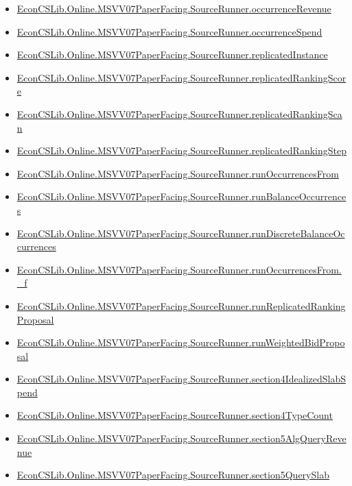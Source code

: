 \documentclass[10pt]{article}
\begin{document}
\begin{itemize}[leftmargin=1.2em]
\begin{itemize}[leftmargin=1.2em]
\item \hyperlink{library-prerequisite-dfbe97ffab7ca7cd}{EconCSLib.Online.MSVV07PaperFacing.SourceRunner.occurrenceRevenue}
\item \hyperlink{library-prerequisite-26a3237cdadc754d}{EconCSLib.Online.MSVV07PaperFacing.SourceRunner.occurrenceSpend}
\item \hyperlink{library-prerequisite-cbbc165407ac6974}{EconCSLib.Online.MSVV07PaperFacing.SourceRunner.replicatedInstance}
\item \hyperlink{library-prerequisite-577eed25c6e44295}{EconCSLib.Online.MSVV07PaperFacing.SourceRunner.replicatedRankingScore}
\item \hyperlink{library-prerequisite-f9094881bfd17c7a}{EconCSLib.Online.MSVV07PaperFacing.SourceRunner.replicatedRankingScan}
\item \hyperlink{library-prerequisite-40e3e9f98c944c47}{EconCSLib.Online.MSVV07PaperFacing.SourceRunner.replicatedRankingStep}
\item \hyperlink{library-prerequisite-f31e5e64ef16e2cc}{EconCSLib.Online.MSVV07PaperFacing.SourceRunner.runOccurrencesFrom}
\item \hyperlink{library-prerequisite-d9300ea6e5b2566f}{EconCSLib.Online.MSVV07PaperFacing.SourceRunner.runBalanceOccurrences}
\item \hyperlink{library-prerequisite-645b23936fd09d4e}{EconCSLib.Online.MSVV07PaperFacing.SourceRunner.runDiscreteBalanceOccurrences}
\item \hyperlink{library-prerequisite-aaf9e733c1bd3341}{EconCSLib.Online.MSVV07PaperFacing.SourceRunner.runOccurrencesFrom.\_f}
\item \hyperlink{library-prerequisite-fd9bc9c4e98ce244}{EconCSLib.Online.MSVV07PaperFacing.SourceRunner.runReplicatedRankingProposal}
\item \hyperlink{library-prerequisite-51c8e4988d8824f9}{EconCSLib.Online.MSVV07PaperFacing.SourceRunner.runWeightedBidProposal}
\item \hyperlink{library-prerequisite-502c8117c74865dd}{EconCSLib.Online.MSVV07PaperFacing.SourceRunner.section4IdealizedSlabSpend}
\item \hyperlink{library-prerequisite-acb543e8a2016958}{EconCSLib.Online.MSVV07PaperFacing.SourceRunner.section4TypeCount}
\item \hyperlink{library-prerequisite-2b8367cf9b3b42aa}{EconCSLib.Online.MSVV07PaperFacing.SourceRunner.section5AlgQueryRevenue}
\item \hyperlink{library-prerequisite-9976c83aae3ad794}{EconCSLib.Online.MSVV07PaperFacing.SourceRunner.section5QuerySlab}

\end{itemize}
\end{itemize}
\end{document}
